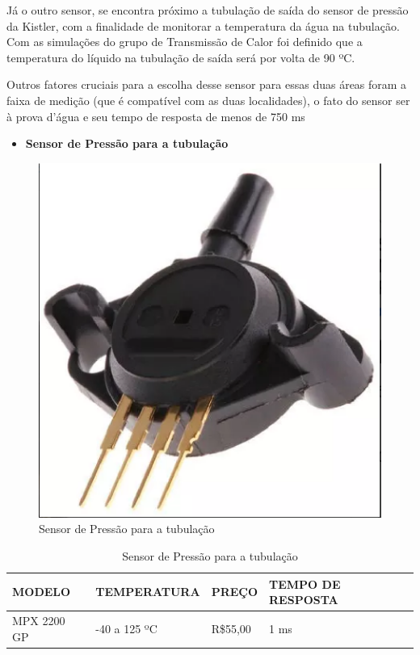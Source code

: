 Já o outro sensor, se encontra próximo a tubulação de saída do sensor de pressão da Kistler, com a finalidade de monitorar a temperatura da água na tubulação. Com as simulações do grupo de Transmissão de Calor foi definido que a temperatura do líquido na tubulação de saída será por volta de 90 ºC.

Outros fatores cruciais para a escolha desse sensor para essas duas áreas foram a faixa de medição (que é compatível com as duas localidades), o fato do sensor ser à prova d’água e seu tempo de resposta de menos de 750 ms

\begin{itemize}
    \item \textbf{Sensor de Pressão para a tubulação}
\end{itemize}
\begin{figure}[!htb]                  
	\centering                          
	\includegraphics[scale=0.3]{figuras/Figura_5.eps}
	\caption{ Sensor de Pressão para a tubulação} \label{figsensor3}          
\end{figure}

\begin{table}[!h]
    \centering
    \begin{tabular}{|p{3cm}|p{5cm}|p{3cm}|p{3cm}|}
    \hline
    \textbf{MODELO} & \textbf{TEMPERATURA}    & \textbf{PREÇO} & \textbf{TEMPO DE RESPOSTA} \\ \hline
    MPX 2200 GP      & -40 a 125 ºC &  R\$55,00 & 1 ms  \\ \hline
    \end{tabular}
    \caption{Sensor de Pressão para a tubulação}
    \end{table}

